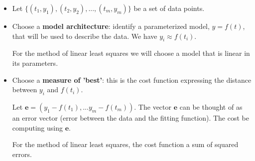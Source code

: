\documentclass[12pt,letterpaper,noanswers]{exam}
\begin{document}
\begin{tcolorbox}

\begin{itemize}
\itemsep0pt
    \item Let $\{(t_1, y_1), (t_2, y_2), ..., (t_m,y_m)\}$ be a set of data points.
    \item Choose a \textbf{model architecture}: identify a parameterized model, $y = f(t)$, that will be used to describe the data.  We have $y_i\approx f(t_i)$.

    For the method of linear least squares we will choose a model that is linear in its parameters.
    \item Choose a \textbf{measure of 'best'}: this is the cost function expressing the distance between $y_i$ and $f(t_i)$.
    
    Let $\mathbf{e} = (y_1-f(t_1),...y_m-f(t_m))$.  The vector $\mathbf{e}$ can be thought of as an error vector (error between the data and the fitting function).  The cost be computing using $\mathbf{e}$.

    For the method of linear least squares, the cost function a sum of squared errors.
\end{itemize}

\end{tcolorbox}
\end{document}
